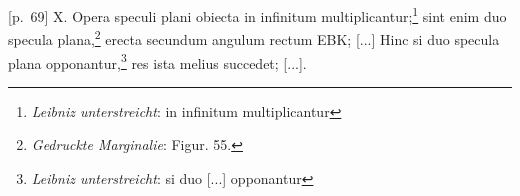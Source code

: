 \pend \pstart {} [p.~69] X. Opera speculi plani\protect{} obiecta in infinitum multiplicantur;\footnote{\textit{Leibniz unterstreicht}: in infinitum multiplicantur} sint enim duo specula plana\protect{},\footnote{\textit{Gedruckte Marginalie}: Figur. 55.} erecta secundum  angulum rectum EBK; [...] Hinc si duo specula plana\protect{} opponantur,\footnote{\textit{Leibniz unterstreicht}: si duo [...] opponantur} res ista melius succedet; [...].\pend \newpage